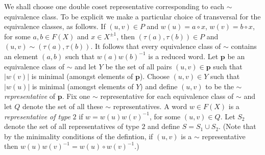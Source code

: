 \documentclass[a4paper,12pt]{article}
\renewcommand{\t}{\tau }
\newcommand{\pp}{\mathbf{p}}
\numberwithin{equation}{section}
\numberwithin{figure}{section}
\begin{document}
We shall choose one double coset representative corresponding to each $\sim$ 
equivalence class. To be explicit we make a particular choice of transversal
for the equivalence classes, as follows. 
If $(u,v)\in P$ and $w(u)=a\circ x$, $w(v)=b\circ x$, for some $a,b\in F(X)$ and 
$x\in X^{\pm 1}$, then $(\t(a),\t(b))\in P$ and $(u,v)\sim (\t(a),\t(b))$. It follows
that every equivalence class of $\sim$ contains an element $(a,b)$ such that
$w(a)w(b)^{-1}$ is a reduced word. Let $\pp$ be an equivalence class of $\sim$ and
let $Y$ be the set of all pairs $(u,v)\in \pp$ such that $|w(v)|$ is minimal (amongst
elements of $\pp$). Choose $(u,v)\in Y$ such that $|w(u)|$ is minimal (amongst elements
of $Y$) and define $(u,v)$ to be the $\sim${\em representative} of $\pp$. Fix
one $\sim$ representative for each equivalence class of $\sim$ and  
let $Q$ denote the set of  all these $\sim$ representatives. A word $w\in F(X)$ is
 a {\em representative of type} $2$ if $w=w(u)w(v)^{-1}$, for some $(u,v)\in Q$. 
Let $S_2$ denote the set of all representatives of type $2$ and define $S=S_1\cup S_2$.
(Note that by the minimality conditions of the defintion, if $(u,v)$ is a 
$\sim$ representative then $w(u)w(v)^{-1}=w(u)\circ w(v)^{-1}$.)
\end{document}
